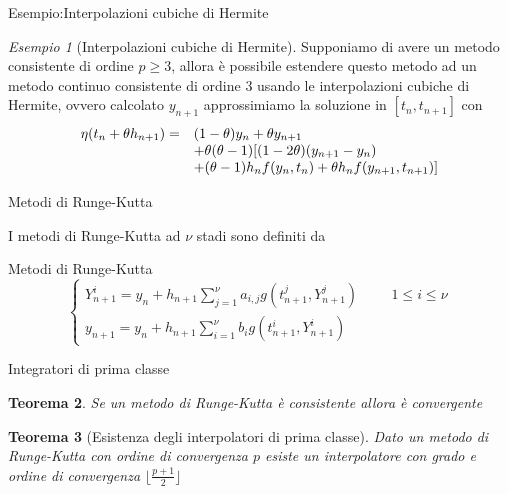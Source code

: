 \documentclass[intlimits]{beamer}
\numberwithin{equation}{section}
\theoremstyle{plain}
\newtheorem{teor}{Teorema}[section]
\theoremstyle{definition}
\theoremstyle{remark}
\newtheorem{esempio}[teor]{Esempio}
\begin{document}
\begin{frame}{Esempio:Interpolazioni cubiche di Hermite}
 \begin{esempio}[Interpolazioni cubiche di Hermite]
Supponiamo di avere un metodo consistente di ordine $p \geq 3$, allora è possibile estendere questo 
metodo ad un metodo continuo consistente di ordine $3$ usando le interpolazioni 
cubiche di Hermite, ovvero calcolato 
$y_{n+1}$ approssimiamo 
la soluzione in $[t_{n},t_{n+1}]$ con 
$$
\begin{array}{c lc}
\eta(t_n+\theta h_{n+1}) = 	&	(1 - \theta) y_n + \theta y_{n+1}				\\
				&	+ \theta (\theta-1)[ (1- 2 \theta ) (y_{n+1} - y_n) 		\\
				&	+(\theta-1)h_n f (y_n,t_n) + \theta h_n f(y_{n+1},t_{n+1}) ] 
\end{array}
$$
\end{esempio}
\end{frame}


\begin{frame}{Metodi di Runge-Kutta}

\pause
I metodi di Runge-Kutta ad $\nu$ stadi sono definiti da

\pause
\begin{block}{Metodi di Runge-Kutta}
$$
\begin{cases}
\displaystyle
Y_{n+1}^i = y_n + h_{n+1} \sum_{j=1}^{\nu} a_{i,j} g(t_{n+1}^j,Y_{n+1}^j)
\hspace{1cm}
1 \le i \le \nu
\\
\displaystyle
y_{n+1} = y_n + h_{n+1} \sum_{i=1}^{\nu} b_i g (t_{n+1}^i,Y_{n+1}^i)
\end{cases}
$$
\end{block}


\end{frame}


\begin{frame}{Integratori di prima classe}

\pause
\begin{teor}
 Se un metodo di Runge-Kutta è consistente allora è convergente
\end{teor}

\pause
\begin{teor}[Esistenza degli interpolatori di prima classe]
Dato un metodo di Runge-Kutta con ordine di convergenza $p$ esiste un interpolatore con grado e ordine di convergenza 
$\lfloor \frac{p+1}{2} \rfloor$ 
\end{teor}
\end{frame}
\end{document}
